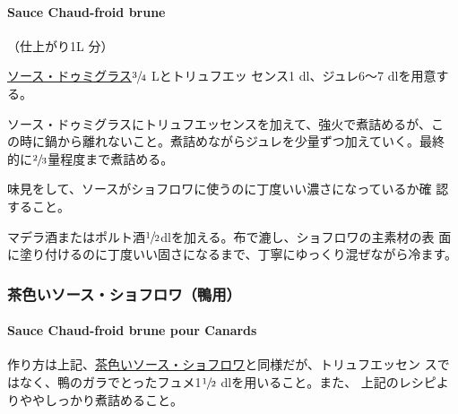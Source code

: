 \hypertarget{sauce-chaud-froid-brune}{%
\paragraph{Sauce Chaud-froid brune}\label{sauce-chaud-froid-brune}}


（仕上がり1L 分）

\protect\hyperlink{sauce-demi-glace}{ソース・ドゥミグラス}\(\sfrac{3}{4}\)
Lとトリュフエッ センス1 dl、ジュレ6〜7 dlを用意する。

ソース・ドゥミグラスにトリュフエッセンスを加えて、強火で煮詰めるが、こ
の時に鍋から離れないこと。煮詰めながらジュレを少量ずつ加えていく。最終
的に\(\sfrac{2}{3}\)量程度まで煮詰める。

味見をして、ソースがショフロワに使うのに丁度いい濃さになっているか確
認すること。

マデラ酒またはポルト酒\(\sfrac{1}{2}\)dlを加える。布で漉し、ショフロワの主素材の表
面に塗り付けるのに丁度いい固さになるまで、丁寧にゆっくり混ぜながら冷ます。

\maeaki

\hypertarget{ux8336ux8272ux3044ux30bdux30fcux30b9ux30b7ux30e7ux30d5ux30edux30efux9d28ux7528}{%
\subsubsection{茶色いソース・ショフロワ（鴨用）}\label{ux8336ux8272ux3044ux30bdux30fcux30b9ux30b7ux30e7ux30d5ux30edux30efux9d28ux7528}}

\hypertarget{sauce-chaud-froid-brune-pour-canards}{%
\paragraph{Sauce Chaud-froid brune pour
Canards}\label{sauce-chaud-froid-brune-pour-canards}}


作り方は上記、\protect\hyperlink{sauce-chaud-froid-brune}{茶色いソース・ショフロワ}と同様だが、トリュフエッセン
スではなく、鴨のガラでとったフュメ1\(\sfrac{1}{2}\)
dlを用いること。また、 上記のレシピよりややしっかり煮詰めること。

